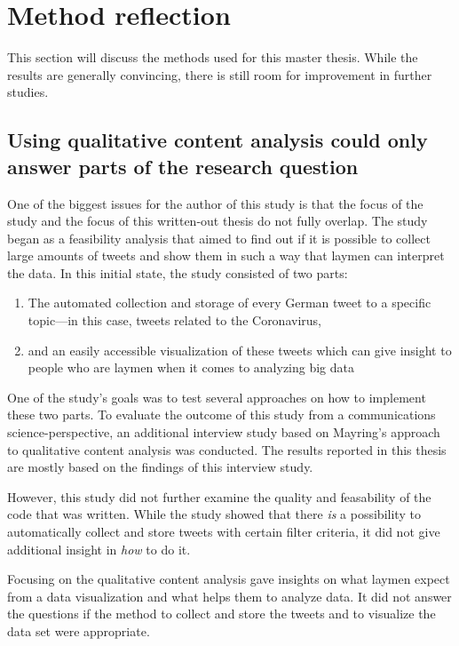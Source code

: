 \section{Method reflection}
This section will discuss the methods used for this master thesis. While the results are generally convincing, there is still room for improvement in further studies.

\subsection*{Using qualitative content analysis could only answer parts of the research question}
One of the biggest issues for the author of this study is that the focus of the study and the focus of this written-out thesis do not fully overlap. The study began as a feasibility analysis that aimed to find out if it is possible to collect large amounts of tweets and show them in such a way that laymen can interpret the data. In this initial state, the study consisted of two parts:

\begin{enumerate}
    \item The automated collection and storage of every German tweet to a specific topic---in this case, tweets related to the Coronavirus,
    \item and an easily accessible visualization of these tweets which can give insight to people who are laymen when it comes to analyzing big data
\end{enumerate}

One of the study's goals was to test several approaches on how to implement these two parts. To evaluate the outcome of this study from a communications science-perspective, an additional interview study based on Mayring's approach to qualitative content analysis was conducted. The results reported in this thesis are mostly based on the findings of this interview study.

However, this study did not further examine the quality and feasability of the code that was written. While the study showed that there \emph{is} a possibility to automatically collect and store tweets with certain filter criteria, it did not give additional insight in \emph{how} to do it. 

Focusing on the qualitative content analysis gave insights on what laymen expect from a data visualization and what helps them to analyze data. It did not answer the questions if the method to collect and store the tweets and to visualize the data set were appropriate.

